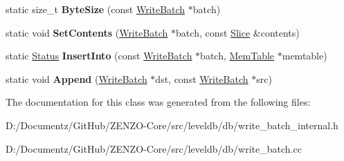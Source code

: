 \begin{DoxyCompactItemize}
static size\+\_\+t {\bfseries Byte\+Size} (const \mbox{\hyperlink{classleveldb_1_1_write_batch}{Write\+Batch}} $\ast$batch)
\item 
\mbox{\label{classleveldb_1_1_write_batch_internal_aa07e75250aed00d06f2e4df85ee926b9}} 
static void {\bfseries Set\+Contents} (\mbox{\hyperlink{classleveldb_1_1_write_batch}{Write\+Batch}} $\ast$batch, const \mbox{\hyperlink{classleveldb_1_1_slice}{Slice}} \&contents)
\item 
\mbox{\label{classleveldb_1_1_write_batch_internal_a102aae14259fd277e2576338ce3e5551}} 
static \mbox{\hyperlink{classleveldb_1_1_status}{Status}} {\bfseries Insert\+Into} (const \mbox{\hyperlink{classleveldb_1_1_write_batch}{Write\+Batch}} $\ast$batch, \mbox{\hyperlink{classleveldb_1_1_mem_table}{Mem\+Table}} $\ast$memtable)
\item 
\mbox{\label{classleveldb_1_1_write_batch_internal_ac83c9a45a815c16ad8602b99b752b4bc}} 
static void {\bfseries Append} (\mbox{\hyperlink{classleveldb_1_1_write_batch}{Write\+Batch}} $\ast$dst, const \mbox{\hyperlink{classleveldb_1_1_write_batch}{Write\+Batch}} $\ast$src)
\end{DoxyCompactItemize}


The documentation for this class was generated from the following files\+:\begin{DoxyCompactItemize}
\item 
D\+:/\+Documentz/\+Git\+Hub/\+Z\+E\+N\+Z\+O-\/\+Core/src/leveldb/db/write\+\_\+batch\+\_\+internal.\+h\item 
D\+:/\+Documentz/\+Git\+Hub/\+Z\+E\+N\+Z\+O-\/\+Core/src/leveldb/db/write\+\_\+batch.\+cc\end{DoxyCompactItemize}
